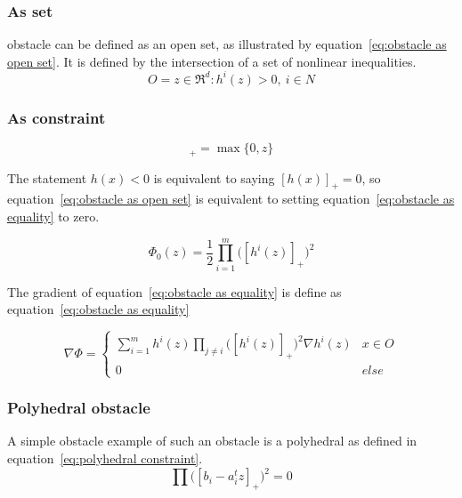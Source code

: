 			\subsubsection{As set}
				 obstacle can be defined as an open set, as illustrated by equation~\ref{eq:obstacle as open set}. It is defined by the intersection of a set of nonlinear inequalities.
				\begin{equation}
					O = {z \in \Re^d : h^i(z)>0,\ i \in N}
					\label{eq:obstacle as open set}
				\end{equation}
				
			\subsubsection{As constraint}
				\begin{equation}
					[z]_+ =  \max\{0,z\}
				\end{equation}
				
				The statement $h(x)<0$ is equivalent to saying $[h(x)]_+=0$, so equation~\ref{eq:obstacle as open set} is equivalent to setting equation~\ref{eq:obstacle as equality} to zero.
				
				\begin{equation}
					\Phi_0(z) =  \frac{1}{2} \prod_{i=1}^m \Big( [h^i(z)]_+ \Big)^2
					\label{eq:obstacle as equality}
				\end{equation}
				
				The gradient of equation~\ref{eq:obstacle as equality} is define as equation~\ref{eq:obstacle as equality}
				
				\begin{equation}
					\nabla \Phi =
					\begin{cases}
						\sum_{i=1}^{m} h^i(z)\prod_{j \ne i} \Big( [h^i(z)]_+ \Big)^2 \nabla h^i(z)
						& x \in O \\
						0 & else
					\end{cases}
					\label{eq:derivative obstacle as equality}
				\end{equation}
			
			\subsubsection{Polyhedral obstacle}
				A simple obstacle example of such an obstacle is a polyhedral as defined in equation~\ref{eq:polyhedral constraint}.
				\begin{equation}
					\prod \Big([b_i - a_i^t z]_+ \Big)^2 = 0
					\label{eq:polyhedral constraint}
				\end{equation}
			

